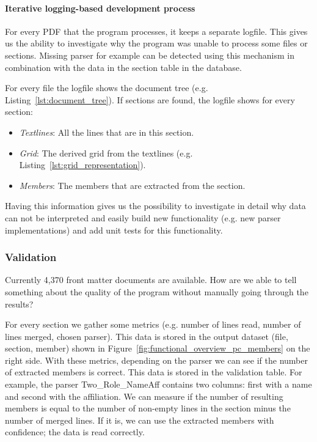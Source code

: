 \documentclass{ou-report}
\begin{document}
\paragraph{Iterative logging-based development process}
For every PDF that the program processes, it keeps a separate logfile. This
gives us the ability to investigate why the program was unable to process some
files or sections. Missing parser for example can be detected using this
mechanism in combination with the data in the section table in the database.

For every file the logfile shows the document tree (e.g.
Listing~\ref{lst:document_tree}). If sections are found, the logfile shows for
every section:
\begin{itemize}
    \item \emph{Textlines}: All the lines that are in this section.
    \item \emph{Grid}: The derived grid from the textlines (e.g.         Listing~\ref{lst:grid_representation}).
    \item \emph{Members}: The members that are extracted from the section.
\end{itemize}
Having this information gives us the possibility to 
investigate in detail why data can not be interpreted and easily build new 
functionality (e.g. new parser implementations) and add unit tests for this 
functionality.

\subsubsection{Validation}
\label{sec:front_matter_validation}
Currently 4,370 front matter documents are available. How are we able to tell 
something about the quality of the program without manually going through the 
results?

For every section we gather some metrics (e.g. number of lines read, number of 
lines merged, chosen parser). This data is stored in the output dataset (file, 
section, member) shown in
Figure~\ref{fig:functional_overview_pc_members} on the right side.
With these metrics, depending 
on the parser we can see if the number of extracted members is correct. This 
data is stored in the validation table.
For example, the parser Two\_Role\_NameAff contains two columns: first with a name
and second with the affiliation. We can measure if the number of resulting 
members is equal to the number of non-empty lines in the section minus the number 
of merged lines. If it is, we can use the extracted members with confidence; 
the data is read correctly.
\end{document}
